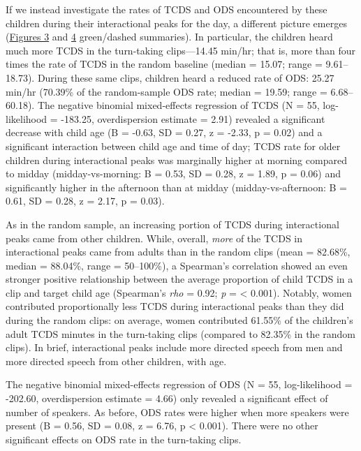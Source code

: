 \documentclass[,man,floatsintext]{apa6}
\begin{document}
If we instead investigate the rates of TCDS and ODS encountered by these
children during their interactional peaks for the day, a different
picture emerges (\protect\hyperlink{fig3}{Figures 3} and
\protect\hyperlink{fig4}{4} green/dashed summaries). In particular, the
children heard much more TCDS in the turn-taking clips---14.45 min/hr;
that is, more than four times the rate of TCDS in the random baseline
(median = 15.07; range = 9.61--18.73). During these same clips, children
heard a reduced rate of ODS: 25.27 min/hr (70.39\% of the random-sample
ODS rate; median = 19.59; range = 6.68--60.18). The negative binomial
mixed-effects regression of TCDS (N = 55, log-likelihood = -183.25,
overdispersion estimate = 2.91) revealed a significant decrease with
child age (B = -0.63, SD = 0.27, z = -2.33, p = 0.02) and a significant
interaction between child age and time of day; TCDS rate for older
children during interactional peaks was marginally higher at morning
compared to midday (midday-vs-morning: B = 0.53, SD = 0.28, z = 1.89, p
= 0.06) and significantly higher in the afternoon than at midday
(midday-vs-afternoon: B = 0.61, SD = 0.28, z = 2.17, p = 0.03).

As in the random sample, an increasing portion of TCDS during
interactional peaks came from other children. While, overall,
\emph{more} of the TCDS in interactional peaks came from adults than in
the random clips (mean = 82.68\%, median = 88.04\%, range = 50--100\%),
a Spearman's correlation showed an even stronger positive relationship
between the average proportion of child TCDS in a clip and target child
age (Spearman's \emph{rho} = 0.92; \emph{p} = \textless{} 0.001).
Notably, women contributed proportionally less TCDS during interactional
peaks than they did during the random clips: on average, women
contributed 61.55\% of the children's adult TCDS minutes in the
turn-taking clips (compared to 82.35\% in the random clips). In brief,
interactional peaks include more directed speech from men and more
directed speech from other children, with age.

The negative binomial mixed-effects regression of ODS (N = 55,
log-likelihood = -202.60, overdispersion estimate = 4.66) only revealed
a significant effect of number of speakers. As before, ODS rates were
higher when more speakers were present (B = 0.56, SD = 0.08, z = 6.76, p
\textless{} 0.001). There were no other significant effects on ODS rate
in the turn-taking clips.
\end{document}
